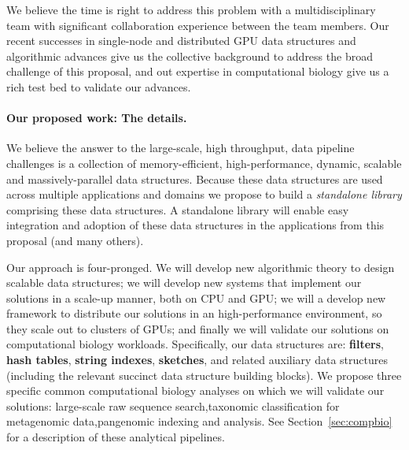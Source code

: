  We believe the time is right to address this problem with a multidisciplinary
team with significant collaboration experience between the team members. Our
recent successes in single-node and distributed GPU data structures and
algorithmic advances give us the
collective background to address the broad challenge of this proposal, and out expertise in computational biology give us a rich test bed to validate our advances.


\paragraph{Our proposed work: The details.}
We believe the answer to the large-scale, high throughput, data pipeline challenges is a collection of  memory-efficient,
high-performance, dynamic, scalable and massively-parallel data structures.
Because these data structures are used across multiple applications and domains
we propose to build a \emph{standalone library} comprising these data
structures.
 A standalone library will enable easy integration and adoption of
these data structures in the applications from this proposal (and many others).

{Our approach is four-pronged.}  We will develop new {algorithmic
theory} to design scalable data structures; we will develop new {systems} that
implement our solutions in a scale-up manner,  both on CPU and GPU\@; we will a
develop new framework to distribute our solutions in an high-performance environment, so
they scale out to clusters of GPUs; and finally we will validate our solutions
on {computational biology} workloads.
%
Specifically, our data structures are: \textbf{filters}, \textbf{hash tables},
\textbf{string indexes}, \textbf{sketches}, and related auxiliary data
structures (including the relevant succinct data structure building blocks).   We propose three specific common computational biology analyses on
which we will validate our solutions: {large-scale raw sequence
search},{taxonomic classification for metagenomic data},{pangenomic indexing
and analysis}.   See Section~\ref{sec:compbio} for a description of these
analytical pipelines.

